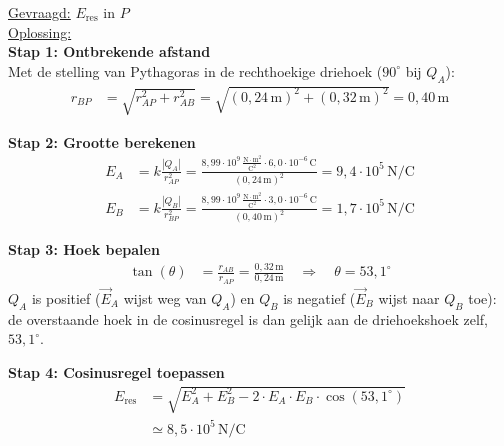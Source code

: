 \documentclass{ximera}
\begin{document}
\begin{exercise}
\begin{solution}
        \underline{Gevraagd:} $E_{\text{res}}$ in $P$\\

        \underline{Oplossing:}\\
        \textbf{Stap 1: Ontbrekende afstand}\\
        Met de stelling van Pythagoras in de rechthoekige driehoek ($90^\circ$ bij $Q_A$):
        \begin{align*}
            r_{BP} &= \sqrt{r_{AP}^{2} + r_{AB}^{2}} = \sqrt{(0{,}24 \, \mathrm{m})^{2} + (0{,}32 \, \mathrm{m})^{2}} = 0{,}40 \, \mathrm{m}
        \end{align*}

        \textbf{Stap 2: Grootte berekenen}
        \begin{align*}
            E_{A} &= k \frac{|Q_{A}|}{r_{AP}^{2}} = \frac{8{,}99 \cdot 10^{9} \, \mathrm{\frac{N \cdot m^2}{C^2}} \cdot 6{,}0 \cdot 10^{-6} \, \mathrm{C}}{(0{,}24 \, \mathrm{m})^{2}} = 9{,}4 \cdot 10^{5} \, \mathrm{N/C} \\
            E_{B} &= k \frac{|Q_{B}|}{r_{BP}^{2}} = \frac{8{,}99 \cdot 10^{9} \, \mathrm{\frac{N \cdot m^2}{C^2}} \cdot 3{,}0 \cdot 10^{-6} \, \mathrm{C}}{(0{,}40 \, \mathrm{m})^{2}} = 1{,}7 \cdot 10^{5} \, \mathrm{N/C}
        \end{align*}

        \textbf{Stap 3: Hoek bepalen}
        \begin{align*}
            \tan(\theta) &= \frac{r_{AB}}{r_{AP}} = \frac{0{,}32 \, \mathrm{m}}{0{,}24 \, \mathrm{m}} \quad\Rightarrow\quad \theta = 53{,}1^\circ
        \end{align*}
        $Q_A$ is positief ($\vec{E}_A$ wijst weg van $Q_A$) en $Q_B$ is negatief ($\vec{E}_B$ wijst naar $Q_B$ toe): de overstaande hoek in de cosinusregel is dan gelijk aan de driehoekshoek zelf, $53{,}1^\circ$.

        \textbf{Stap 4: Cosinusregel toepassen}
        \begin{align*}
            E_{\text{res}} &= \sqrt{E_A^{2} + E_B^{2} - 2 \cdot E_A \cdot E_B \cdot \cos(53{,}1^\circ)} \\
                            &\simeq \boxed{8{,}5 \cdot 10^{5} \, \mathrm{N/C}}
        \end{align*}
    \end{solution}
\end{exercise}
\end{document}
